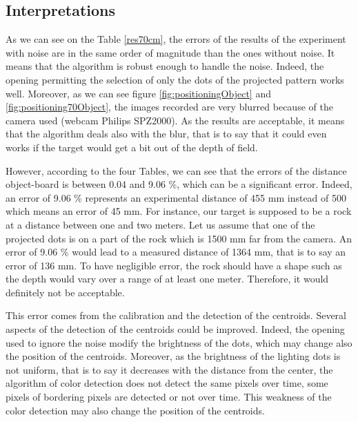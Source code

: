 \subsection{Interpretations}
As we can see on the Table \ref{res70cm}, the errors of the results of the experiment with noise are in the same order of magnitude than the ones without noise. It means that the algorithm is robust enough to handle the noise. Indeed, the 
opening permitting the selection of only the dots of the projected pattern works well. Moreover, as we can see figure \ref{fig:positioningObject} and \ref{fig:positioning70Object}, the images recorded are very blurred because of the camera used (webcam Philips SPZ2000). As the results are acceptable, it means that the algorithm deals also with the blur, that is to say that it could even works if the target would get a bit out of the depth of field.

However, according to the four Tables, we can see that the errors of the distance object-board is between 0.04 and 9.06 \%, which can be a significant error. Indeed, an error of 9.06 \% represents an experimental distance of 455 mm instead of 500 which means an error of 45 mm. For instance, our target is supposed to be a rock at a distance between one and two meters. Let us assume that one of the projected dots is on a part of the rock which is 1500 mm far from the camera. An error of 9.06 \% would lead to a measured distance of 1364 mm, that is to say an error of 136 mm. To have negligible error, the rock should have a shape such as the depth would vary over a range of at least one meter. Therefore, it would definitely not be acceptable.

This error comes from the calibration and the detection of the centroids. Several aspects of the detection of the centroids could be improved. Indeed, the opening used to ignore the noise modify the brightness of the dots, which may change also the position of the centroids. Moreover, as the brightness of the lighting dots is not uniform, that is to say it decreases with the distance from the center, the algorithm of color detection does not detect the same pixels over time, some pixels of bordering pixels are detected or not over time. This weakness of the color detection may also change the position of the centroids.

